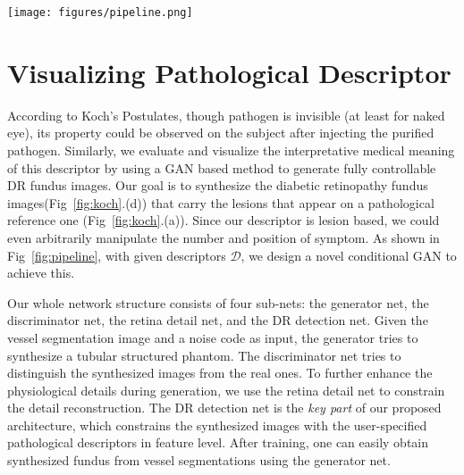 \documentclass[letterpaper]{article} %
\begin{document}
    
	
	
	
	\begin{figure*}[h!]
		\begin{center}
			\texttt{[image: figures/pipeline.png]}
		\end{center}
		\caption{The architecture and data flow of our symptom transfer GAN, which contains four nets in training phase. After training, the generator itself is able to synthesize retinal fundus with lesions on specific locations.}
		\label{fig:pipeline}
	\end{figure*}
	
	\section{Visualizing Pathological Descriptor}
    
    According to Koch's Postulates, though pathogen is invisible (at least for naked eye), its property could be observed on the subject after injecting the purified pathogen. Similarly, we evaluate and visualize the interpretative medical meaning of this descriptor by using a GAN based method to generate fully controllable DR fundus images.  Our goal is to synthesize the diabetic retinopathy fundus images(Fig~\ref{fig:koch}.(d)) that carry the lesions that appear on a pathological reference one (Fig~\ref{fig:koch}.(a)). Since our descriptor is lesion based, we could even arbitrarily manipulate the number and position of symptom. As shown in Fig~\ref{fig:pipeline}, with given descriptors $ \mathcal{D} $, we design a novel conditional GAN to achieve this.
    
    Our whole network structure consists of four sub-nets: the generator net, the discriminator net, the retina detail net, and the DR detection net. Given the vessel segmentation image and a noise code as input, the generator tries to synthesize a tubular structured phantom. The discriminator net tries to distinguish the synthesized images from the real ones. To further enhance the physiological details during generation, we use the retina detail net to constrain the detail reconstruction. The DR detection net is the \emph{key part} of our proposed architecture, which constrains the synthesized images with the user-specified pathological descriptors in feature level. After training, one can easily obtain synthesized fundus from vessel segmentations using the generator net.
\end{document}
